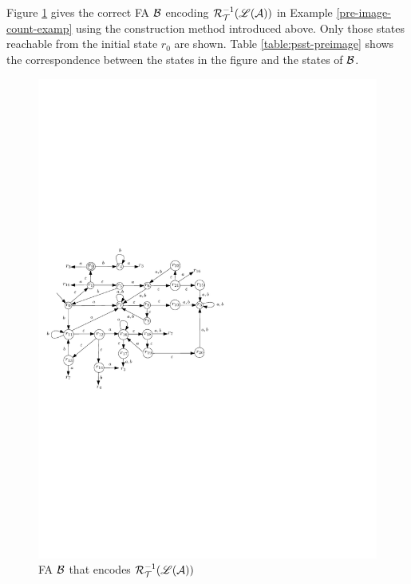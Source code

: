 \begin{example}
Figure \ref{fig-psst-preimage-exmp} gives the correct FA $\mathcal{B}$ encoding $\mathcal{R}^{-1}_{\mathcal{T}}(\mathscr{L}(\mathcal{A}))$ in Example \ref{pre-image-count-examp} using the construction method introduced above. Only those states reachable from the initial state $r_0$ are shown. Table \ref{table:psst-preimage} shows the correspondence between the states in the figure and the states of $\mathcal{B}$.

\end{example}


\begin{figure}[ht]
\centering
\includegraphics[scale=0.8]{psst-preimage-example.pdf}
\caption{FA $\mathcal{B}$ that encodes $\mathcal{R}^{-1}_{\mathcal{T}}(\mathscr{L}(\mathcal{A}))$}
\label{fig-psst-preimage-exmp}
\end{figure}

